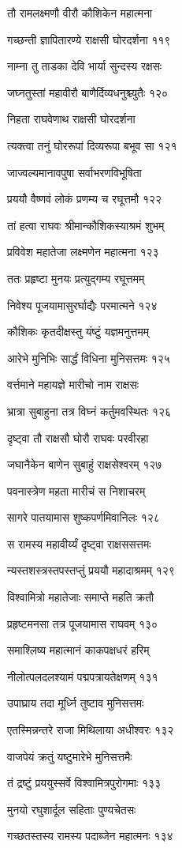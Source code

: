 तौ रामलक्ष्मणौ वीरौ कौशिकेन महात्मना

गच्छन्ती ज्ञापितारण्ये राक्षसी घोरदर्शना ११९

नाम्ना तु ताडका देवि भार्या सुन्दस्य रक्षसः

जघ्नतुस्तां महावीरौ बाणैर्दिव्यधनुश्च्युतैः १२०

निहता राघवेणाथ राक्षसी घोरदर्शना

त्यक्त्वा तनुं घोररूपां दिव्यरूपा बभूव सा १२१

जाज्वल्यमानावपुषा सर्वाभरणविभूषिता

प्रययौ वैष्णवं लोकं प्रणम्य च रघूत्तमौ १२२

तां हत्वा राघवः श्रीमान्कौशिकस्याश्रमं शुभम्

प्रविवेश महातेजा लक्ष्मणेन महात्मना १२३

ततः प्रहृष्टा मुनयः प्रत्युद्गम्य रघूत्तमम्

निवेश्य पूजयामासुरर्घाद्यैः परमात्मने १२४

कौशिकः कृतदीक्षस्तु यंष्टुं यज्ञमनुत्तमम्

आरेभे मुनिभिः सार्द्धं विधिना मुनिसत्तमः १२५

वर्त्तमाने महायज्ञे मारीचो नाम राक्षसः

भ्रात्रा सुबाहुना तत्र विघ्नं कर्तुमवस्थितः १२६

दृष्ट्वा तौ राक्षसौ घोरौ राघवः परवीरहा

जघानैकेन बाणेन सुबाहुं राक्षसेश्वरम् १२७

पवनास्त्रेण महता मारीचं स निशाचरम्

सागरे पातयामास शुष्कपर्णमिवानिलः १२८

स रामस्य महावीर्य्यं दृष्ट्वा राक्षससत्तमः

न्यस्तशस्त्रस्तपस्तप्तुं प्रययौ महादाश्रमम् १२९

विश्वामित्रो महातेजाः समाप्ते महति क्रतौ

प्रहृष्टमनसा तत्र पूजयामास राघवम् १३०

समाश्लिष्य महात्मानं काकपक्षधरं हरिम्

नीलोत्पलदलश्यामं पद्मपत्रायतेक्षणम् १३१

उपाघ्राय तदा मूर्ध्नि तुष्टाव मुनिसत्तमः

एतस्मिन्नन्तरे राजा मिथिलाया अधीश्वरः १३२

वाजपेयं क्रतुं यष्टुमारेभे मुनिसत्तमैः

तं द्रष्टुं प्रययुस्सर्वे विश्वामित्रपुरोगमाः १३३

मुनयो रघुशार्दूल सहिताः पुण्यचेतसः

गच्छतस्तस्य रामस्य पदाब्जेन महात्मनः १३४

